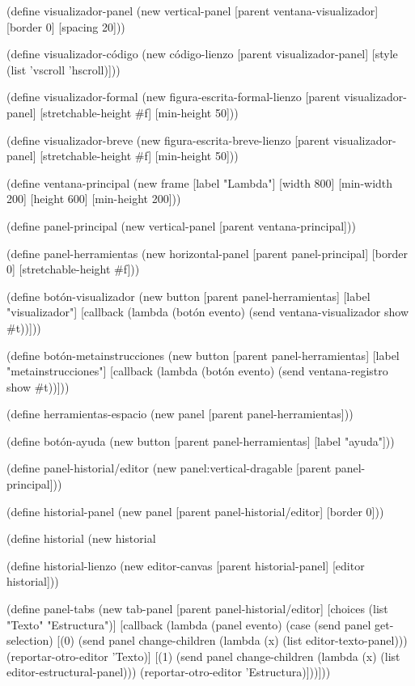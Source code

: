 \documentclass[10pt,oneside,openany,letterpaper]{book}
\begin{document}
(define visualizador-panel
  (new vertical-panel%
       [parent ventana-visualizador]
       [border 0]
       [spacing 20]))

(define visualizador-código
  (new código-lienzo%
       [parent visualizador-panel]
       [style (list 'vscroll 'hscroll)]))

(define visualizador-formal
  (new figura-escrita-formal-lienzo%
       [parent visualizador-panel]
       [stretchable-height #f]
       [min-height 50]))

(define visualizador-breve
  (new figura-escrita-breve-lienzo%
       [parent visualizador-panel]
       [stretchable-height #f]
       [min-height 50]))

(define ventana-principal
  (new frame%
       [label "Lambda"]
       [width 800]  [min-width 200]
       [height 600] [min-height 200]))

(define panel-principal
  (new vertical-panel%
       [parent ventana-principal]))

(define panel-herramientas
  (new horizontal-panel%
       [parent panel-principal]
       [border 0]
       [stretchable-height #f]))

(define botón-visualizador
  (new button%
       [parent panel-herramientas]
       [label "visualizador"]
       [callback
        (lambda (botón evento)
          (send ventana-visualizador show #t))]))

(define botón-metainstrucciones
  (new button%
       [parent panel-herramientas]
       [label "metainstrucciones"]
       [callback
        (lambda (botón evento)
          (send ventana-registro show #t))]))

(define herramientas-espacio
  (new panel%
       [parent panel-herramientas]))

(define botón-ayuda
  (new button%
       [parent panel-herramientas]
       [label "ayuda"]))

(define panel-historial/editor
  (new panel:vertical-dragable%
       [parent panel-principal]))

(define historial-panel
  (new panel%
       [parent panel-historial/editor]
       [border 0]))

(define historial (new historial%

(define historial-lienzo
  (new editor-canvas%
       [parent historial-panel]
       [editor historial]))

(define panel-tabs
  (new tab-panel%
       [parent panel-historial/editor]
       [choices (list "Texto" "Estructura")]
       [callback
        (lambda (panel evento)
          (case (send panel get-selection)
            [(0)
             (send panel change-children (lambda (x) (list editor-texto-panel)))
             (reportar-otro-editor 'Texto)]
            [(1)
             (send panel change-children (lambda (x) (list editor-estructural-panel)))
             (reportar-otro-editor 'Estructura)]))]))
\end{document}
